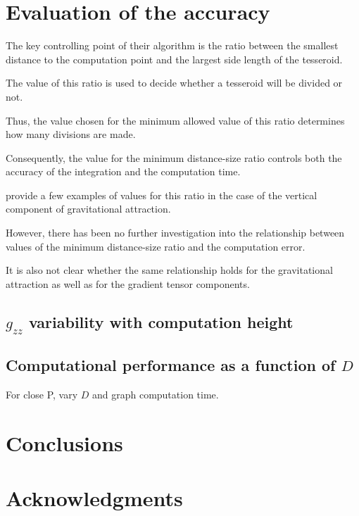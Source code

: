\documentclass[paper,twocolumn]{geophysics}
\begin{document}
\section{Evaluation of the accuracy}

The key controlling point of their algorithm is the ratio between
the smallest distance to the computation point and
the largest side length of the tesseroid.

The value of this ratio is used to decide whether a tesseroid will be divided
or not.

Thus, the value chosen for the minimum allowed value of this ratio determines
how many divisions are made.

Consequently, the value for the minimum distance-size ratio controls both the
accuracy of the integration and the computation time.

\citet{Li2011} provide a few examples of values for this ratio in the case of
the vertical component of gravitational attraction.

However, there has been no further investigation into
the relationship between values of the minimum distance-size
ratio and the computation error.

It is also not clear whether the same relationship holds for the gravitational
attraction as well as for the gradient tensor components.

\subsection{$g_{zz}$ variability with computation height}


\subsection{Computational performance as a function of $D$}

For close P, vary $D$ and graph computation time.


\section{Conclusions}

\section{Acknowledgments}




\end{document}
